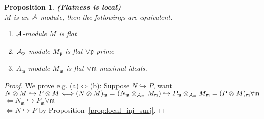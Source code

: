 \documentclass[11pt]{article}
\newtheorem{prop}[thm]{Proposition}
\newcommand{\scm}{{\mathfrak m}}
\newcommand{\scp}{{\mathfrak p}}
\newcommand{\cala}{{\cal A}}
\newcommand{\Llrta}{\Longleftrightarrow}
\newcommand{\inj}{\hookrightarrow}
\begin{document}
\begin{prop}
\textbf{(Flatness is local)}\\
$M$ is an $\cala$-module, then the followings are equivalent.
\begin{enumerate}[label=(\alph*)]
\item $\cala$-module $M$ is flat
\item $\cala_\scp$-module $M_\scp$ is flat $\forall \scp$ prime
\item $A_\scm$-module $M_\scm$ is flat $\forall \scm$ maximal ideals.
\end{enumerate}
\end{prop}
\begin{proof}We prove e.g. 
(a)$\Llrta$(b): Suppose $N\inj P$, want $N\otimes M\inj P\otimes M\Llrta (N\otimes M)_\scm=(N_\scm\otimes_{\cala_\scm}M_\scm)\inj P_\scm\otimes_{\cala_\scm} M_\scm= (P\otimes M)_\scm\forall \scm$ \\
$\Longleftarrow N_\scm\inj P_\scm\forall \scm$\\
$\Llrta N\inj P$ by Proposition~\ref{prop:local_inj_surj}.
\end{proof}
\end{document}
